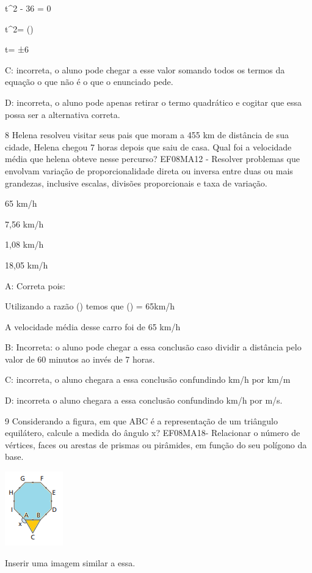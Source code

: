 t^2 - 36 = 0

t^2= ()

t= ±6

C: incorreta, o aluno pode chegar a esse valor somando todos os termos
da equação o que não é o que o enunciado pede.

D: incorreta, o aluno pode apenas retirar o termo quadrático e cogitar
que essa possa ser a alternativa correta.

\num{8} Helena resolveu visitar seus pais que moram a 455 km de distância de
sua cidade, Helena chegou 7 horas depois que saiu de casa. Qual foi a
velocidade média que helena obteve nesse percurso? EF08MA12 - Resolver
problemas que envolvam variação de proporcionalidade direta ou inversa
entre duas ou mais grandezas, inclusive escalas, divisões proporcionais
e taxa de variação.

\item 65 km/h
\item 7,56 km/h
\item 1,08 km/h
\item 18,05 km/h

A: Correta pois:

Utilizando a razão () temos que
() = 65km/h

A velocidade média desse carro foi de 65 km/h

B: Incorreta: o aluno pode chegar a essa conclusão caso dividir a
distância pelo valor de 60 minutos ao invés de 7 horas.

C: incorreta, o aluno chegara a essa conclusão confundindo km/h por km/m

D: incorreta o aluno chegara a essa conclusão confundindo km/h por m/s.

\num{9} Considerando a figura, em que ABC é a representação de um triângulo
equilátero, calcule a medida do ângulo x? EF08MA18- Relacionar o número
de vértices, faces ou arestas de prismas ou pirâmides, em função do seu
polígono da base.

\includegraphics[width=0\times 98958in,height=1\times 26042in]{./imgSAEB_8_MAT/media/image56.png}

Inserir uma imagem similar a essa.


